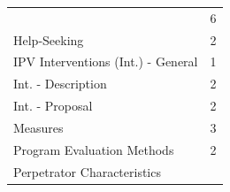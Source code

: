 \documentclass[]{tufte-handout}
\begin{document}
\begin{longtable}[]{@{}ll@{}}
\begin{minipage}[t]{0.50\columnwidth}
\end{minipage} & \begin{minipage}[t]{0.21\columnwidth}\raggedright\strut
6\strut
\end{minipage}\tabularnewline
\begin{minipage}[t]{0.50\columnwidth}\raggedright\strut
Help-Seeking\strut
\end{minipage} & \begin{minipage}[t]{0.21\columnwidth}\raggedright\strut
2\strut
\end{minipage}\tabularnewline
\begin{minipage}[t]{0.50\columnwidth}\raggedright\strut
IPV Interventions (Int.) - General\strut
\end{minipage} & \begin{minipage}[t]{0.21\columnwidth}\raggedright\strut
1\strut
\end{minipage}\tabularnewline
\begin{minipage}[t]{0.50\columnwidth}\raggedright\strut
Int. - Description\strut
\end{minipage} & \begin{minipage}[t]{0.21\columnwidth}\raggedright\strut
2\strut
\end{minipage}\tabularnewline
\begin{minipage}[t]{0.50\columnwidth}\raggedright\strut
Int. - Proposal\strut
\end{minipage} & \begin{minipage}[t]{0.21\columnwidth}\raggedright\strut
2\strut
\end{minipage}\tabularnewline
\begin{minipage}[t]{0.50\columnwidth}\raggedright\strut
Measures\strut
\end{minipage} & \begin{minipage}[t]{0.21\columnwidth}\raggedright\strut
3\strut
\end{minipage}\tabularnewline
\begin{minipage}[t]{0.50\columnwidth}\raggedright\strut
Program Evaluation Methods\strut
\end{minipage} & \begin{minipage}[t]{0.21\columnwidth}\raggedright\strut
2\strut
\end{minipage}\tabularnewline
\begin{minipage}[t]{0.50\columnwidth}\raggedright\strut
Perpetrator Characteristics\strut
\end{minipage} & \begin{minipage}[t]{0.21\columnwidth}\raggedright\strut

\end{minipage}
\end{longtable}
\end{document}
